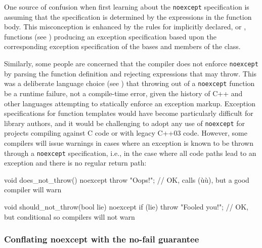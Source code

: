 One source of confusion when first learning about the \lstinline!noexcept!
specification is assuming that the specification is determined by the
expressions in the function body. This misconception is enhanced by the
rules for implicitly declared, or , functions (see
) producing an exception specification
based upon the corresponding exception specification of the bases and
members of the class.

Similarly, some people are concerned that the compiler does not enforce
\lstinline!noexcept! by parsing the function definition and rejecting
expressions that may throw. This was a deliberate language choice (see
) that
throwing out of a \lstinline!noexcept!
function be a runtime failure, not a compile-time error, given the
history of C++ and other languages attempting to statically enforce an
exception markup. Exception specifications for function templates would
have become particularly difficult for library authors, and it would be
challenging to adopt any use of \lstinline!noexcept! for projects compiling
against C code or with legacy C++03 code. However, some compilers will
issue warnings in cases where an exception is known to be thrown through
a \lstinline!noexcept! specification, i.e., in the case where all code
paths lead to an exception and there is no regular return path:

\begin{emcppslisting}
void does_not_throw() noexcept
{
    throw "Oops!";  // OK, calls (ù{}ù), but a good compiler will warn
}

void should_not_throw(bool lie) noexcept
{
    if (lie)
    {
        throw "Fooled you!";  // OK, but conditional so compilers will not warn
    }
}
\end{emcppslisting}
    

\subsubsection[Conflating \lstinline!noexcept! with the no-fail guarantee]{Conflating {\SubsubsecCode noexcept} with the no-fail guarantee}\label{conflating-noexcept-with-the-no-fail-guarantee}

